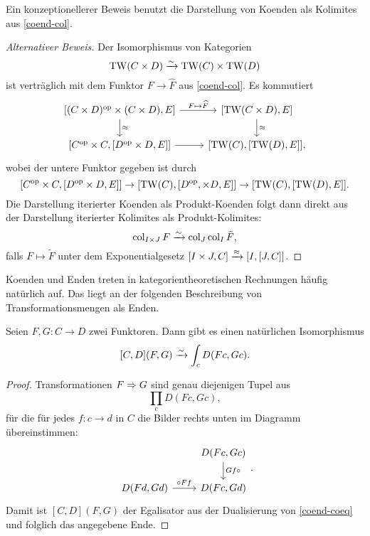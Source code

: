  Ein konzeptionellerer Beweis benutzt die Darstellung von Koenden als
 Kolimites aus \ref{coend-col}.
\begin{proof}[Alternativer Beweis]
  Der Isomorphismus von Kategorien
  \[ \operatorname{TW}(C \times D) \xrightarrow[]{\sim} \operatorname{TW}(C) \times \operatorname{TW}(D) \]
  ist verträglich mit dem Funktor $F \to \widehat{F}$ aus
  \ref{coend-col}. Es kommutiert
  \[ \begin{tikzcd}
    {[(C \times D)\op \times (C \times D), E]}
    \arrow{d}{\approx} \arrow{r}{F \mapsto \widehat{F}}
    & {[\TW(C \times D), E]} \arrow{d}{\approx} \\
    {[C\op \times C, [D\op \times D, E]]} \arrow{r}
    & {[\TW(C), [\TW(D), E]]},
  \end{tikzcd}
  \]
  wobei der untere Funktor gegeben ist durch
  \[ [C^\mathrm{op} \times C, [D^\mathrm{op} \times D, E]]
  \to [\operatorname{TW}(C), [D^\mathrm{op}, \times D, E]] \to [\operatorname{TW}(C), [\operatorname{TW}(D), E]].
  \]
  Die Darstellung iterierter Koenden als Produkt-Koenden folgt dann
  direkt aus der Darstellung iterierter Kolimites als
  Produkt-Kolimites:
  \[ \operatorname{col}_{I \times J} F \xrightarrow[]{\sim} \operatorname{col}_J \operatorname{col}_I \tilde{F}, \]
  falls $F \mapsto \tilde{F}$ unter dem Exponentialgesetz $[I \times
    J, C] \xrightarrow{\approx} {[I, [J, C]]}$.
\end{proof}

Koenden und Enden treten in kategorientheoretischen Rechnungen häufig
natürlich auf. Das liegt an der folgenden Beschreibung von
Transformationsmengen als Enden.
\begin{lemma}
  \label{trans-end}
  Seien $F, G: C \to D$ zwei Funktoren. Dann gibt es einen natürlichen
  Isomorphismus
  \[ [C, D](F, G) \xrightarrow[]{\sim} \int_c D(Fc, Gc). \]
\end{lemma}
\begin{proof}
  Transformationen $F \Rightarrow G$ sind genau diejenigen Tupel aus
  \[ \prod_c D(Fc, Gc), \]
  für die für jedes $f: c \to d$ in $C$ die Bilder rechts unten im
  Diagramm übereinstimmen:
  \[ \begin{tikzcd}
    & D(Fc, Gc) \arrow{d}{Gf \circ} \\
    D(Fd, Gd) \arrow{r}{\circ Ff} & D(Fc, Gd)
  \end{tikzcd}. \]
  Damit ist $[C, D](F, G)$ der Egalisator aus der Dualisierung von
  \ref{coend-coeq} und folglich das angegebene Ende.
\end{proof}

